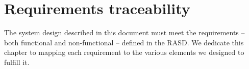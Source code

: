 \chapter{Requirements traceability}
\label{ch:req_traceability}
The system design described in this document must meet the requirements --
both functional and non-functional -- defined in the RASD. We dedicate this
chapter to mapping each requirement to the various elements we designed to
fulfill it.


